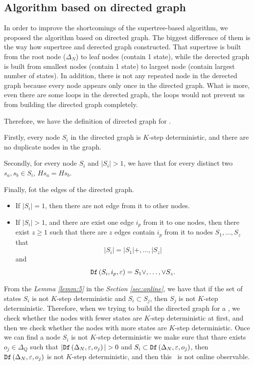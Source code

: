 \subsection{Algorithm based on directed graph}
In order to improve the shortcomings of the supertree-based algorithm, we proposed the algorithm based on directed graph. The biggest difference of them is the way how supertree and derected graph constructed. That supertree is built from the root node ($\Delta_N$) to leaf nodes (contain 1 state), while the derected graph is built from smallest nodes (contain 1 state) to largest node (contain largest number of states). In addition, there is not any repeated node in the derected graph because every node appears only once in the directed graph. What is more, even there are some loops in the derected graph, the loops would not prevent us from building the directed graph completely.

Therefore, we have the definition of directed graph for \BCNs.
\begin{definition}
Firstly, every node $S_i$ in the directed graph is $K$-step deterministic, and there are no duplicate nodes in the graph. 

Secondly, for every node $S_i$  and $|S_i|>1$, we have that for every distinct two $s_a, s_b \in S_i$, $Hs_a=Hs_b$. 

Finally, fot the edges of the directed graph. 
\begin{itemize}
 \item If $|S_i|=1$, then there are not edge from it to other nodes.
 \item  If $|S_i|>1$, and there are exist one edge $i_p$ from it to one nodes, then there exist $z\ge 1$ such that there are $z$ edges contain $i_p$ from it to nodes $S_1,\ldots,S_z$ that \[|S_i|= |S_1|+,\ldots,|S_z|\] and \[{\tt Df}\left(S_i,i_p,\varepsilon\right)=S_1\vee,\ldots,\vee S_z.\]
 \end{itemize}

\end{definition}

From the {\em Lemma \ref{lemm:5}} in the {\em Section \ref{sec:online}}, we have that if the set of states $S_i$ is not $K$-step deterministic and $S_i\subset S_j$, then $S_j$ is not $K$-step deterministic. Therefore, when we trying to build the directed graph for a \BCN, we check whether the nodes with fewer states are $K$-step deterministic at first, and then we check whether the nodes with more states are $K$-step deterministic. Once we can find a node $S_i$ is not $K$-step deterministic we make sure that 
thare exists $o_j \in \Delta_Q$ such that $|\Ded\left(\Delta_N,\varepsilon, o_j\right)|> 0$ and $S_i\subset {\tt Df}\left(\Delta_N,\varepsilon, o_j\right)$, then ${\tt Df}\left(\Delta_N,\varepsilon,o_j\right)$ is not $K$-step deterministic, and then this \BCN\ is not online observable. %

